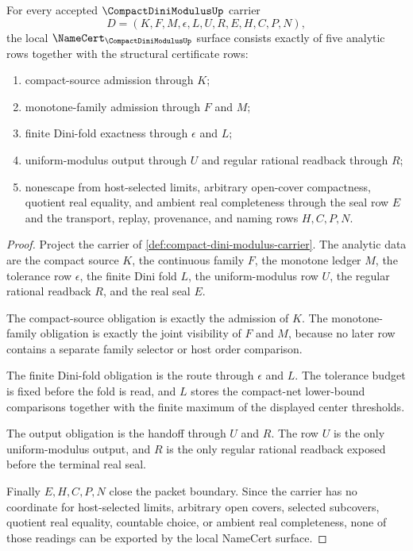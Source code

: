 \begin{theorem}
\label{thm:compact-dini-modulus-namecert-obligations}
For every accepted $\CompactDiniModulusUp$ carrier
$$
D=(K,F,M,\epsilon,L,U,R,E,H,C,P,N),
$$
the local $\NameCert_{\CompactDiniModulusUp}$ surface consists exactly of five analytic rows together with the structural certificate rows:
\begin{enumerate}
\item compact-source admission through $K$;
\item monotone-family admission through $F$ and $M$;
\item finite Dini-fold exactness through $\epsilon$ and $L$;
\item uniform-modulus output through $U$ and regular rational readback through $R$;
\item nonescape from host-selected limits, arbitrary open-cover compactness, quotient real equality, and ambient real completeness through the seal row $E$ and the transport, replay, provenance, and naming rows $H,C,P,N$.
\end{enumerate}
\end{theorem}
\begin{proof}
Project the carrier of \autoref{def:compact-dini-modulus-carrier}. The analytic data are the compact source $K$, the continuous family $F$, the monotone ledger $M$, the tolerance row $\epsilon$, the finite Dini fold $L$, the uniform-modulus row $U$, the regular rational readback $R$, and the real seal $E$.

The compact-source obligation is exactly the admission of $K$. The monotone-family obligation is exactly the joint visibility of $F$ and $M$, because no later row contains a separate family selector or host order comparison.

The finite Dini-fold obligation is the route through $\epsilon$ and $L$. The tolerance budget is fixed before the fold is read, and $L$ stores the compact-net lower-bound comparisons together with the finite maximum of the displayed center thresholds.

The output obligation is the handoff through $U$ and $R$. The row $U$ is the only uniform-modulus output, and $R$ is the only regular rational readback exposed before the terminal real seal.

Finally $E,H,C,P,N$ close the packet boundary. Since the carrier has no coordinate for host-selected limits, arbitrary open covers, selected subcovers, quotient real equality, countable choice, or ambient real completeness, none of those readings can be exported by the local NameCert surface.
\end{proof}

